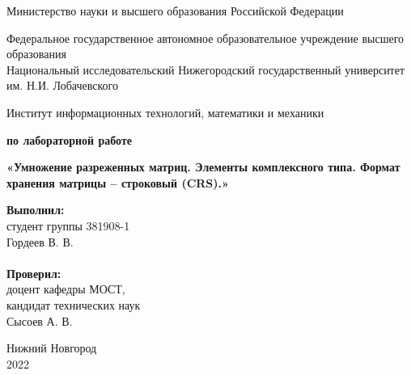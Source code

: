 \documentclass{report}
\begin{document}
\begin{titlepage}

\begin{center}
Министерство науки и высшего образования Российской Федерации
\end{center}

\begin{center}
Федеральное государственное автономное образовательное учреждение высшего образования \\
Национальный исследовательский Нижегородский государственный университет им. Н.И. Лобачевского
\end{center}

\begin{center}
Институт информационных технологий, математики и механики
\end{center}

\vspace{4em}

\begin{center}
\textbf{ по лабораторной работе} \\
\end{center}
\begin{center}
\textbf{\Large«Умножение разреженных матриц. Элементы комплексного типа. Формат хранения матрицы – строковый (CRS).»} \\
\end{center}

\vspace{4em}

\newbox{\lbox}
\newlength{\maxl}
\setlength{\maxl}{\wd\lbox}
\hfill\parbox{7cm}{
\hspace*{5cm}\hspace*{-5cm}\textbf{Выполнил:} \\ студент группы 381908-1 \\ Гордеев В. В.\\
\\
\hspace*{5cm}\hspace*{-5cm}\textbf{Проверил:}\\ доцент кафедры МОСТ, \\ кандидат технических наук \\ Сысоев А. В.\\
}
\vspace{\fill}

\begin{center} Нижний Новгород \\ 2022 \end{center}

\end{titlepage}
\end{document}
